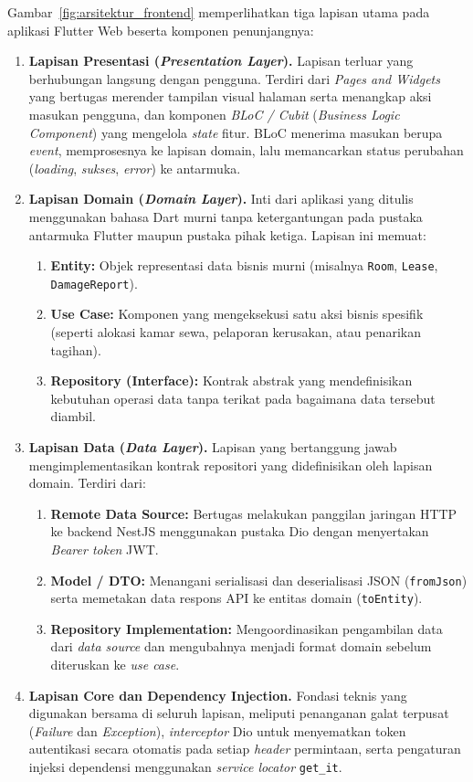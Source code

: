 Gambar~\ref{fig:arsitektur_frontend} memperlihatkan tiga lapisan utama pada aplikasi Flutter Web beserta komponen penunjangnya:
\begin{enumerate}[label=\arabic*., leftmargin=*]
  \item \textbf{Lapisan Presentasi (\textit{Presentation Layer}).} Lapisan terluar yang berhubungan langsung dengan pengguna. Terdiri dari \textit{Pages and Widgets} yang bertugas merender tampilan visual halaman serta menangkap aksi masukan pengguna, dan komponen \textit{BLoC / Cubit} (\textit{Business Logic Component}) yang mengelola \textit{state} fitur. BLoC menerima masukan berupa \textit{event}, memprosesnya ke lapisan domain, lalu memancarkan status perubahan (\textit{loading}, \textit{sukses}, \textit{error}) ke antarmuka.
  \item \textbf{Lapisan Domain (\textit{Domain Layer}).} Inti dari aplikasi yang ditulis menggunakan bahasa Dart murni tanpa ketergantungan pada pustaka antarmuka Flutter maupun pustaka pihak ketiga. Lapisan ini memuat:
    \begin{enumerate}[label=\alph*., leftmargin=*]
      \item \textbf{Entity:} Objek representasi data bisnis murni (misalnya \texttt{Room}, \texttt{Lease}, \texttt{DamageReport}).
      \item \textbf{Use Case:} Komponen yang mengeksekusi satu aksi bisnis spesifik (seperti alokasi kamar sewa, pelaporan kerusakan, atau penarikan tagihan).
      \item \textbf{Repository (Interface):} Kontrak abstrak yang mendefinisikan kebutuhan operasi data tanpa terikat pada bagaimana data tersebut diambil.
    \end{enumerate}
  \item \textbf{Lapisan Data (\textit{Data Layer}).} Lapisan yang bertanggung jawab mengimplementasikan kontrak repositori yang didefinisikan oleh lapisan domain. Terdiri dari:
    \begin{enumerate}[label=\alph*., leftmargin=*]
      \item \textbf{Remote Data Source:} Bertugas melakukan panggilan jaringan HTTP ke backend NestJS menggunakan pustaka Dio dengan menyertakan \textit{Bearer token} JWT.
      \item \textbf{Model / DTO:} Menangani serialisasi dan deserialisasi JSON (\texttt{fromJson}) serta memetakan data respons API ke entitas domain (\texttt{toEntity}).
      \item \textbf{Repository Implementation:} Mengoordinasikan pengambilan data dari \textit{data source} dan mengubahnya menjadi format domain sebelum diteruskan ke \textit{use case}.
    \end{enumerate}
  \item \textbf{Lapisan Core dan Dependency Injection.} Fondasi teknis yang digunakan bersama di seluruh lapisan, meliputi penanganan galat terpusat (\textit{Failure} dan \textit{Exception}), \textit{interceptor} Dio untuk menyematkan token autentikasi secara otomatis pada setiap \textit{header} permintaan, serta pengaturan injeksi dependensi menggunakan \textit{service locator} \texttt{get\_it}.
\end{enumerate}

